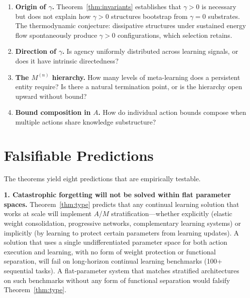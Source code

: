 \documentclass[11pt]{article}
\theoremstyle{definition}
\theoremstyle{remark}
\begin{document}
\begin{enumerate}
\item \textbf{Origin of $\gamma$.} Theorem~\ref{thm:invariants}
      establishes that $\gamma > 0$ is necessary but does not explain
      how $\gamma > 0$ structures bootstrap from $\gamma = 0$
      substrates. The thermodynamic conjecture: dissipative structures
      \cite{Prigogine1984, England2013} under sustained energy flow
      spontaneously produce $\gamma > 0$ configurations, which selection
      retains.

\item \textbf{Direction of $\gamma$.} Is agency uniformly distributed
      across learning signals, or does it have intrinsic directedness?

\item \textbf{The $M^{(n)}$ hierarchy.} How many levels of
      meta-learning does a persistent entity require? Is there a natural
      termination point, or is the hierarchy open upward without bound?

\item \textbf{Bound composition in $A$.} How do individual action
      bounds compose when multiple actions share knowledge substructure?
\end{enumerate}

\section{Falsifiable Predictions}
\label{sec:predictions}

The theorems yield eight predictions that are empirically testable.

\textbf{1. Catastrophic forgetting will not be solved within flat
parameter spaces.}
Theorem~\ref{thm:type} predicts that any continual learning solution
that works at scale will implement $A$/$M$ stratification---whether
explicitly (elastic weight consolidation, progressive networks,
complementary learning systems) or implicitly (by learning to protect
certain parameters from learning updates). A solution that uses a
single undifferentiated parameter space for both action execution and
learning, with no form of weight protection or functional separation,
will fail on long-horizon continual learning benchmarks (100+
sequential tasks). A flat-parameter system that matches stratified
architectures on such benchmarks without any form of functional
separation would falsify Theorem~\ref{thm:type}.
\end{document}
